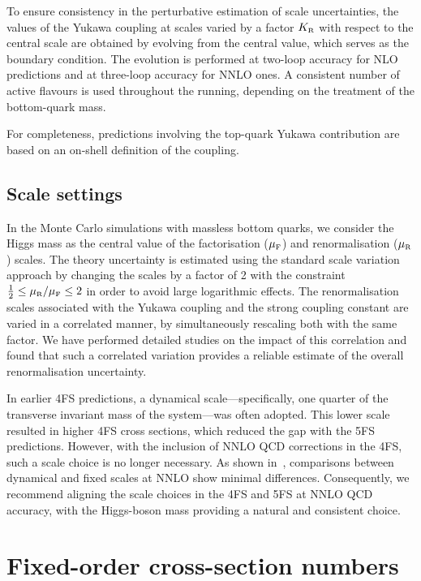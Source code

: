 \documentclass[11pt,a4paper]{article}
\begin{document}
To ensure consistency in the perturbative estimation of scale uncertainties, the values of the Yukawa coupling at scales varied by a factor $\KR$ with respect to the central scale are obtained by evolving from the central value, which serves as the boundary condition. The evolution is performed at two-loop accuracy for NLO predictions and at three-loop accuracy for NNLO ones. A consistent number of active flavours is used throughout the running, depending on the treatment of the bottom-quark mass.

For completeness, predictions involving the top-quark Yukawa contribution are based on an on-shell definition of the coupling.

\subsection{Scale settings}
In the Monte Carlo simulations with massless bottom quarks, we consider the Higgs mass as the central value of the factorisation ($\muF$) and renormalisation ($\muR$) scales. The theory uncertainty is estimated using the standard scale variation approach by changing the scales by a factor of 2 with the constraint $\frac{1}{2}\leq\muR/\muF\leq 2$ in order to avoid large logarithmic effects. The renormalisation scales associated with the Yukawa coupling and the strong coupling constant are varied in a correlated manner, by simultaneously rescaling both with the same factor. We have performed detailed studies on the impact of this correlation and found that such a correlated variation provides a reliable estimate of the overall renormalisation uncertainty.

In earlier 4FS predictions, a dynamical scale—specifically, one quarter of the transverse invariant mass of the \bbH{} system—was often adopted. This lower scale resulted in higher 4FS cross sections, which reduced the gap with the 5FS predictions. However, with the inclusion of NNLO QCD corrections in the 4FS, such a scale choice is no longer necessary. As shown in~, comparisons between dynamical and fixed scales at NNLO show minimal differences. Consequently, we recommend aligning the scale choices in the 4FS and 5FS at NNLO QCD accuracy, with the Higgs-boson mass providing a natural and consistent choice.

\section{Fixed-order cross-section numbers}
\end{document}
